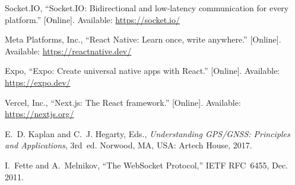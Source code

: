 \begin{enumerate}[label={[\arabic*]}, leftmargin=1.2cm, itemsep=6pt]
  \item Socket.IO, ``Socket.IO: Bidirectional and low-latency
  communication for every platform.'' [Online]. Available:
  \url{https://socket.io/}

  \item Meta Platforms, Inc., ``React Native: Learn once, write
  anywhere.'' [Online]. Available: \url{https://reactnative.dev/}

  \item Expo, ``Expo: Create universal native apps with React.''
  [Online]. Available: \url{https://expo.dev/}

  \item Vercel, Inc., ``Next.js: The React framework.'' [Online].
  Available: \url{https://nextjs.org/}

  \item E.~D. Kaplan and C.~J. Hegarty, Eds., \emph{Understanding
  GPS/GNSS: Principles and Applications}, 3rd~ed. Norwood, MA, USA:
  Artech House, 2017.

  \item I.~Fette and A.~Melnikov, ``The WebSocket Protocol,'' IETF
  RFC~6455, Dec. 2011.
\end{enumerate}
